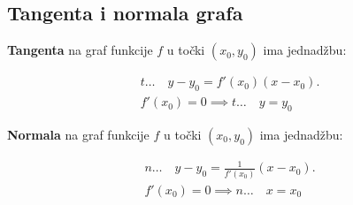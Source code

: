 \subsection{Tangenta i normala grafa}

\textbf{Tangenta} na graf funkcije $f$ u točki $(x_0,y_0)$ ima jednadžbu:

\begin{gather*}
t\dots\quad y-y_0=f'(x_0)(x-x_0).\\
f'(x_0)=0\implies t\dots\quad y = y_0
\end{gather*}

\noindent
\textbf{Normala} na graf funkcije $f$ u točki $(x_0,y_0)$ ima jednadžbu:

\begin{gather*}
n\dots\quad y-y_0=\frac{1}{f'(x_0)}(x-x_0).\\
f'(x_0)=0\implies n\dots\quad x = x_0
\end{gather*}
